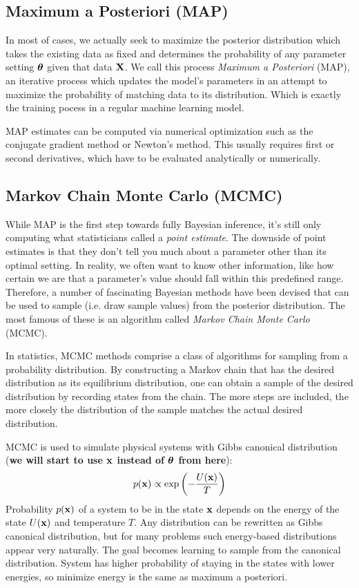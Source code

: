 \subsection{Maximum a Posteriori (MAP)}
In most of cases, we actually seek to maximize the posterior distribution which takes the existing data as fixed and determines the probability of any parameter setting $\bm\theta$ given that data $\mathbf{X}$. We call this process \emph{Maximum a Posteriori} (MAP), an iterative process which updates the model’s parameters in an attempt to maximize the probability of matching data to its distribution. Which is exactly the training pocess in a regular machine learning model.

MAP estimates can be computed via numerical optimization such as the conjugate gradient method or Newton's method. This usually requires first or second derivatives, which have to be evaluated analytically or numerically.

\subsection{Markov Chain Monte Carlo (MCMC)}
While MAP is the first step towards fully Bayesian inference, it’s still only computing what statisticians called a \emph{point estimate}. The downside of point estimates is that they don’t tell you much about a parameter other than its optimal setting. In reality, we often want to know other information, like how certain we are that a parameter’s value should fall within this predefined range. Therefore, a number of fascinating Bayesian methods have been devised that can be used to sample (i.e. draw sample values) from the posterior distribution. The most famous of these is an algorithm called \emph{Markov Chain Monte Carlo} (MCMC).

In statistics, MCMC methods comprise a class of algorithms for sampling from a probability distribution. By constructing a Markov chain that has the desired distribution as its equilibrium distribution, one can obtain a sample of the desired distribution by recording states from the chain. The more steps are included, the more closely the distribution of the sample matches the actual desired distribution. 

MCMC is used to simulate physical systems with Gibbs canonical distribution (\textbf{we will start to use $\mathbf{x}$ instead of $\bm\theta$ from here}):
\begin{equation}
	p(\mathbf{x}) \propto \exp\left( - \frac{U(\mathbf{x})}{T} \right)
\end{equation}
Probability $p(\mathbf{x})$ of a system to be in the state $\mathbf{x}$ depends on the energy of the state $U(\mathbf{x})$ and temperature $T$.
Any distribution can be rewritten as Gibbs canonical distribution, but for many problems such energy-based distributions appear very naturally.
The goal becomes learning to sample from the canonical distribution.
System has higher probability of staying in the states with lower energies, so minimize energy is the same as maximum a posteriori.

